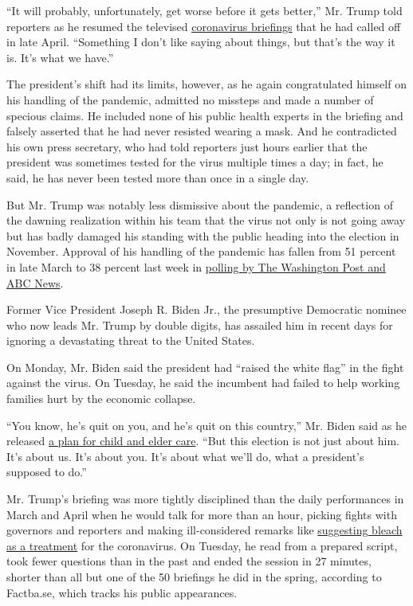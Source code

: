 ``It will probably, unfortunately, get worse before it gets better,''
Mr. Trump told reporters as he resumed the televised
\href{https://www.nytimes.com/2020/07/28/us/politics/trump-nobody-likes-me-walks-out-briefing.html}{coronavirus
briefings} that he had called off in late April. ``Something I don't
like saying about things, but that's the way it is. It's what we have.''

The president's shift had its limits, however, as he again congratulated
himself on his handling of the pandemic, admitted no missteps and made a
number of specious claims. He included none of his public health experts
in the briefing and falsely asserted that he had never resisted wearing
a mask. And he contradicted his own press secretary, who had told
reporters just hours earlier that the president was sometimes tested for
the virus multiple times a day; in fact, he said, he has never been
tested more than once in a single day.

But Mr. Trump was notably less dismissive about the pandemic, a
reflection of the dawning realization within his team that the virus not
only is not going away but has badly damaged his standing with the
public heading into the election in November. Approval of his handling
of the pandemic has fallen from 51 percent in late March to 38 percent
last week in
\href{https://www.langerresearch.com/wp-content/uploads/1214a22020Election.pdf}{polling
by The Washington Post and ABC News}.

Former Vice President Joseph R. Biden Jr., the presumptive Democratic
nominee who now leads Mr. Trump by double digits, has assailed him in
recent days for ignoring a devastating threat to the United States.

On Monday, Mr. Biden said the president had ``raised the white flag'' in
the fight against the virus. On Tuesday, he said the incumbent had
failed to help working families hurt by the economic collapse.

``You know, he's quit on you, and he's quit on this country,'' Mr. Biden
said as he released
\href{https://www.nytimes.com/2020/07/21/us/politics/biden-workplace-childcare.html}{a
plan for child and elder care}. ``But this election is not just about
him. It's about us. It's about you. It's about what we'll do, what a
president's supposed to do.''

Mr. Trump's briefing was more tightly disciplined than the daily
performances in March and April when he would talk for more than an
hour, picking fights with governors and reporters and making
ill-considered remarks like
\href{https://www.nytimes.com/2020/04/24/us/politics/trump-inject-disinfectant-bleach-coronavirus.html}{suggesting
bleach as a treatment} for the coronavirus. On Tuesday, he read from a
prepared script, took fewer questions than in the past and ended the
session in 27 minutes, shorter than all but one of the 50 briefings he
did in the spring, according to Factba.se, which tracks his public
appearances.


